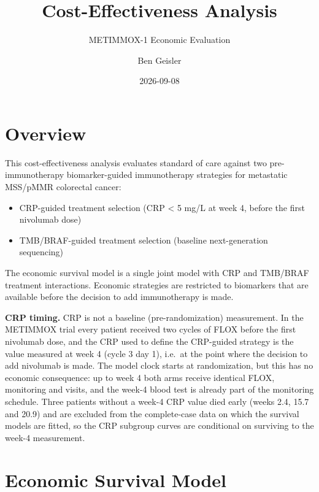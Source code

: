 \documentclass[
  11pt,
  a4paper]{article}
\title{Cost-Effectiveness Analysis}
\subtitle{METIMMOX-1 Economic Evaluation}
\author{Ben Geisler}
\date{2026-09-08}
\providecommand{\tightlist}{%
  \setlength{\itemsep}{0pt}\setlength{\parskip}{0pt}}\usepackage{longtable,booktabs,array}
\renewcommand*\contentsname{Table of contents}
\newcommand\contentsname{Table of contents}
\begin{document}
\maketitle

\renewcommand*\contentsname{Table of contents}
{
\hypersetup{linkcolor=}
\setcounter{tocdepth}{3}
\tableofcontents
}

\section{Overview}\label{overview}

This cost-effectiveness analysis evaluates standard of care against two
pre-immunotherapy biomarker-guided immunotherapy strategies for
metastatic MSS/pMMR colorectal cancer:

\begin{itemize}
\tightlist
\item
  CRP-guided treatment selection (CRP \textless{} 5 mg/L at week 4,
  before the first nivolumab dose)
\item
  TMB/BRAF-guided treatment selection (baseline next-generation
  sequencing)
\end{itemize}

The economic survival model is a single joint model with CRP and
TMB/BRAF treatment interactions. Economic strategies are restricted to
biomarkers that are available before the decision to add immunotherapy
is made.

\textbf{CRP timing.} CRP is not a baseline (pre-randomization)
measurement. In the METIMMOX trial every patient received two cycles of
FLOX before the first nivolumab dose, and the CRP used to define the
CRP-guided strategy is the value measured at week 4 (cycle 3 day 1),
i.e.~at the point where the decision to add nivolumab is made. The model
clock starts at randomization, but this has no economic consequence: up
to week 4 both arms receive identical FLOX, monitoring and visits, and
the week-4 blood test is already part of the monitoring schedule. Three
patients without a week-4 CRP value died early (weeks 2.4, 15.7 and
20.9) and are excluded from the complete-case data on which the survival
models are fitted, so the CRP subgroup curves are conditional on
surviving to the week-4 measurement.

\section{Economic Survival Model}\label{economic-survival-model}
\end{document}
